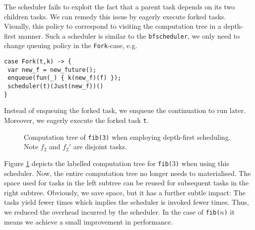\documentclass[preprint,10pt,numbers]{sigplanconf}
\begin{document}
The scheduler fails to exploit the fact that a parent task depends on its two children tasks. We can remedy this issue by eagerly execute forked tasks. Visually, this policy to correspond to visiting the computation tree in a depth-first manner. Such a scheduler is similar to the \texttt{bfscheduler}, we only need to change queuing policy in the \texttt{Fork}-case, e.g.
\begin{lstlisting}[style={links},caption={}]
case Fork(t,k) -> {
 var new_f = new_future();
 enqueue(fun(_) { k(new_f)(f) });
 scheduler(t)(Just(new_f))()
}
\end{lstlisting}
Instead of enqueuing the forked task, we enqueue the continuation to run later. Moreover, we eagerly execute the forked task \texttt{t}.
\begin{figure}
\begin{center}
\caption{Computation tree of \texttt{fib(3)} when employing depth-first scheduling. Note $f_2$ and $f_2'$ are disjoint tasks.}\label{fig:dfs}
\end{center}
\end{figure}
Figure \ref{fig:dfs} depicts the labelled computation tree for \texttt{fib($3$)} when using this scheduler. Now, the entire computation tree no longer needs to materialised. The space used for tasks in the left subtree can be reused for subsequent tasks in the right subtree. Obviously, we save space, but it has a further subtle impact: The tasks yield fewer times which implies the scheduler is invoked fewer times. Thus, we reduced the overhead incurred by the scheduler. In the case of \texttt{fib($n$)} it means we achieve a small improvement in performance.
\end{document}
